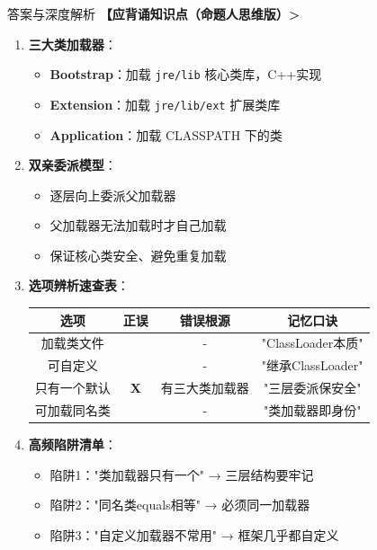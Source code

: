 \documentclass[12pt, a4paper]{ctexart}
\begin{document}
\begin{bluebox}{答案与深度解析}
\textbf{【应背诵知识点（命题人思维版）>}
\begin{enumerate}[leftmargin=*, nosep]
	\item \textbf{三大类加载器}：
	      \begin{itemize}[label={}, nosep]
		      \item \textbf{Bootstrap}：加载 \texttt{jre/lib} 核心类库，C++实现
		      \item \textbf{Extension}：加载 \texttt{jre/lib/ext} 扩展类库
		      \item \textbf{Application}：加载 CLASSPATH 下的类
	      \end{itemize}

	\item \textbf{双亲委派模型}：
	      \begin{itemize}[label={}, nosep]
		      \item 逐层向上委派父加载器
		      \item 父加载器无法加载时才自己加载
		      \item 保证核心类安全、避免重复加载
	      \end{itemize}

	\item \textbf{选项辨析速查表}：
	      \begin{tabular}{|c|c|c|c|}
		      \hline
		      \textbf{选项} & \textbf{正误} & \textbf{错误根源} & \textbf{记忆口诀}   \\
		      \hline
		      加载类文件       & \checkmark  & -             & "ClassLoader本质" \\
		      \hline
		      可自定义        & \checkmark  & -             & "继承ClassLoader" \\
		      \hline
		      只有一个默认      & \textbf{X}  & 有三大类加载器       & "三层委派保安全"       \\
		      \hline
		      可加载同名类      & \checkmark  & -             & "类加载器即身份"       \\
		      \hline
	      \end{tabular}

	\item \textbf{高频陷阱清单}：
	      \begin{itemize}[label={}, nosep]
		      \item 陷阱1："类加载器只有一个" → 三层结构要牢记
		      \item 陷阱2："同名类equals相等" → 必须同一加载器
		      \item 陷阱3："自定义加载器不常用" → 框架几乎都自定义
	      \end{itemize}
\end{enumerate}


\end{bluebox}
\end{document}
